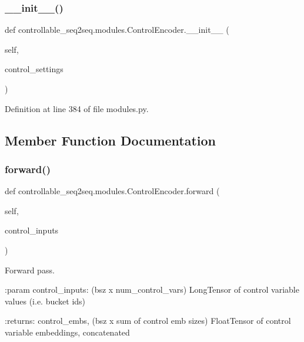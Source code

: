 \subsubsection{\texorpdfstring{\+\_\+\+\_\+init\+\_\+\+\_\+()}{\_\_init\_\_()}}
{\footnotesize\ttfamily def controllable\+\_\+seq2seq.\+modules.\+Control\+Encoder.\+\_\+\+\_\+init\+\_\+\+\_\+ (\begin{DoxyParamCaption}\item[{}]{self,  }\item[{}]{control\+\_\+settings }\end{DoxyParamCaption})}



Definition at line 384 of file modules.\+py.



\subsection{Member Function Documentation}
\mbox{\label{classcontrollable__seq2seq_1_1modules_1_1ControlEncoder_ae678ed4e13762eb620c918f32de0ca11}} 
\subsubsection{\texorpdfstring{forward()}{forward()}}
{\footnotesize\ttfamily def controllable\+\_\+seq2seq.\+modules.\+Control\+Encoder.\+forward (\begin{DoxyParamCaption}\item[{}]{self,  }\item[{}]{control\+\_\+inputs }\end{DoxyParamCaption})}

\begin{DoxyVerb}Forward pass.

:param control_inputs: (bsz x num_control_vars) LongTensor of control
    variable values (i.e. bucket ids)

:returns: control_embs, (bsz x sum of control emb sizes) FloatTensor of
    control variable embeddings, concatenated
\end{DoxyVerb}
 

